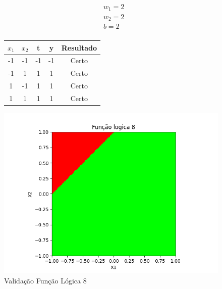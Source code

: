\begin{figure}[h!]
\centering
\begin{minipage}[c]{0.49\linewidth}
\centering
\[
\begin{aligned}
&w_1 = 2\\
&w_2 = 2\\
&b = 2\\
\end{aligned}
\]
\begin{tabular}{|c|c|c|c|c|}\hline
$x_1$ & $x_2$ & t & y & Resultado\\ \hline
 -1 & -1 & -1 & -1 & Certo\\ \hline
 -1 & 1 & 1 & 1 & Certo\\ \hline
 1 & -1 & 1 & 1 & Certo\\ \hline
 1 & 1 & 1 & 1 & Certo\\ \hline
\end{tabular}
\end{minipage}
\hfill
\begin{minipage}[c]{0.5\linewidth}
\centering
\singlespacing
\includegraphics[width=1.2\textwidth]{im/im8}
\end{minipage}
\caption{Validação Função Lógica 8}
\label{vl8}
\end{figure}

